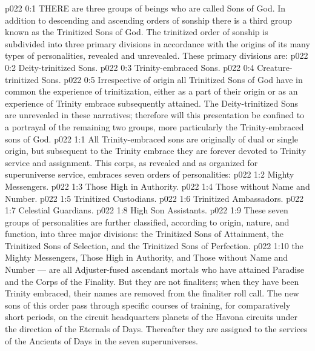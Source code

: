 \vs p022 0:1 THERE are three groups of beings who are called Sons of God. In addition to descending and ascending orders of sonship there is a third group known as the Trinitized Sons of God. The trinitized order of sonship is subdivided into three primary divisions in accordance with the origins of its many types of personalities, revealed and unrevealed. These primary divisions are:
\vs p022 0:2 \bibnobreakspace Deity\hyp{}trinitized Sons.
\vs p022 0:3 \bibnobreakspace Trinity\hyp{}embraced Sons.
\vs p022 0:4 \bibnobreakspace Creature\hyp{}trinitized Sons.
\vs p022 0:5 Irrespective of origin all Trinitized Sons of God have in common the experience of trinitization, either as a part of their origin or as an experience of Trinity embrace subsequently attained. The Deity\hyp{}trinitized Sons are unrevealed in these narratives; therefore will this presentation be confined to a portrayal of the remaining two groups, more particularly the Trinity\hyp{}embraced sons of God.
\vs p022 1:1 All Trinity\hyp{}embraced sons are originally of dual or single origin, but subsequent to the Trinity embrace they are forever devoted to Trinity service and assignment. This corps, as revealed and as organized for superuniverse service, embraces seven orders of personalities:
\vs p022 1:2 \bibnobreakspace Mighty Messengers.
\vs p022 1:3 \bibnobreakspace Those High in Authority.
\vs p022 1:4 \bibnobreakspace Those without Name and Number.
\vs p022 1:5 \bibnobreakspace Trinitized Custodians.
\vs p022 1:6 \bibnobreakspace Trinitized Ambassadors.
\vs p022 1:7 \bibnobreakspace Celestial Guardians.
\vs p022 1:8 \bibnobreakspace High Son Assistants.
\vs p022 1:9 \pc These seven groups of personalities are further classified, according to origin, nature, and function, into three major divisions: the Trinitized Sons of Attainment, the Trinitized Sons of Selection, and the Trinitized Sons of Perfection.
\vs p022 1:10 \pc {} the Mighty Messengers, Those High in Authority, and Those without Name and Number --- are all Adjuster\hyp{}fused ascendant mortals who have attained Paradise and the Corps of the Finality. But they are not finaliters; when they have been Trinity embraced, their names are removed from the finaliter roll call. The new sons of this order pass through specific courses of training, for comparatively short periods, on the circuit headquarters planets of the Havona circuits under the direction of the Eternals of Days. Thereafter they are assigned to the services of the Ancients of Days in the seven superuniverses.
